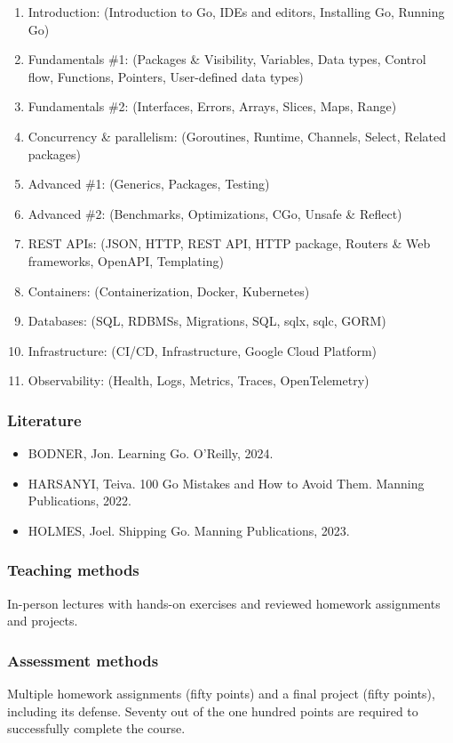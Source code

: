 \documentclass[
  digital,
  color,
  oneside,
  nosansbold,
  nocolorbold,
  lof,
  nolot,
]{fithesis4}
\begin{document}
\begin{enumerate}
    \item Introduction: (Introduction to Go, IDEs and editors, Installing Go, Running Go)
    \item Fundamentals \#1: (Packages \& Visibility, Variables, Data types, Control flow, Functions, Pointers, User-defined data types)
    \item Fundamentals \#2: (Interfaces, Errors, Arrays, Slices, Maps, Range)
    \item Concurrency \& parallelism: (Goroutines, Runtime, Channels, Select, Related packages)
    \item Advanced \#1: (Generics, Packages, Testing)
    \item Advanced \#2: (Benchmarks, Optimizations, CGo, Unsafe \& Reflect)
    \item REST APIs: (JSON, HTTP, REST API, HTTP package, Routers \& Web frameworks, OpenAPI, Templating)
    \item Containers: (Containerization, Docker, Kubernetes)
    \item Databases: (SQL, RDBMSs, Migrations, SQL, sqlx, sqlc, GORM)
    \item Infrastructure: (CI/CD, Infrastructure, Google Cloud Platform)
    \item Observability: (Health, Logs, Metrics, Traces, OpenTelemetry)
\end{enumerate}

\subsubsection{Literature}

\begin{itemize}
    \item BODNER, Jon. Learning Go. O’Reilly, 2024.\cite{learning-go}
    \item HARSANYI, Teiva. 100 Go Mistakes and How to Avoid Them. Manning Publications, 2022.\cite{100-go-mistakes}
    \item HOLMES, Joel. Shipping Go. Manning Publications, 2023.\cite{shipping-go}
\end{itemize}

\subsubsection{Teaching methods}

In-person lectures with hands-on exercises and reviewed homework assignments and projects.

\subsubsection{Assessment methods}

Multiple homework assignments (fifty points) and a final project (fifty points), including its defense. Seventy out of the one hundred points are required to successfully complete the course.
\end{document}
